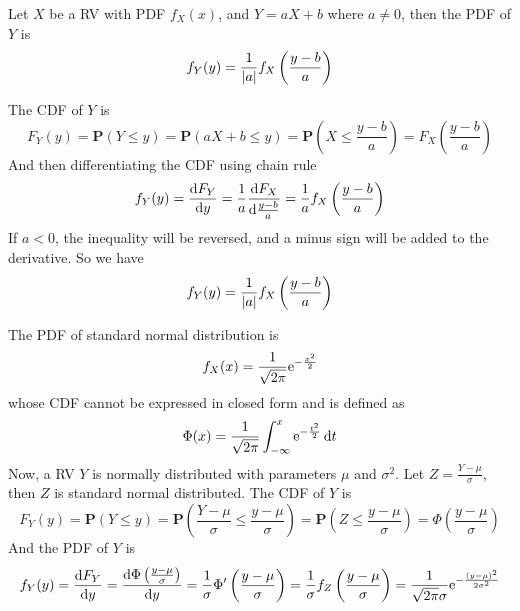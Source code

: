 \begin{example}[PDF of $Y = aX+b$]
    Let $X$ be a RV with PDF $f_{X}(x)$, and $Y = aX + b$ where $a \neq 0$, then the PDF of $Y$ is
    \begin{equation}
        f_{Y}(y) = \frac{1}{\abs{a}} f_{X}\left(\frac{y - b}{a}\right)
    \end{equation}
\end{example}
\begin{solution}
    The CDF of $Y$ is
    \begin{equation}
        F_{Y}(y) = \mathbf{P}(Y \leq y) = \mathbf{P}(aX + b \leq y) = \mathbf{P}\left(X \leq \frac{y - b}{a}\right) = F_{X}\left(\frac{y - b}{a}\right)
    \end{equation}
    And then differentiating the CDF using chain rule
    \begin{equation}
        f_{Y}(y) = \dv{F_{Y}}{y} = \frac{1}{a} \dv{F_{X}}{\frac{y - b}{a}} = \frac{1}{a} f_{X}\left(\frac{y - b}{a}\right)
    \end{equation}
    If $a < 0$, the inequality will be reversed, and a minus sign will be added to the derivative. So we have
    \begin{equation}
        f_{Y}(y) = \frac{1}{\abs{a}} f_{X}\left(\frac{y - b}{a}\right)
    \end{equation}
\end{solution}

\begin{example}
    The PDF of standard normal distribution is
    \begin{equation}
        f_{X}(x) = \frac{1}{\sqrt{2\pi}} \mathrm{e}^{-\frac{x^2}{2}}
    \end{equation}
    whose CDF cannot be expressed in closed form and is defined as
    \begin{equation}
        \Phi(x) = \frac{1}{\sqrt{2\pi}} \int_{-\infty}^{x} \mathrm{e}^{-\frac{t^2}{2}} \dd{t}
    \end{equation}
    Now, a RV $Y$ is normally distributed with parameters $\mu$ and $\sigma^2$. Let $Z = \frac{Y - \mu}{\sigma}$, then $Z$ is standard normal distributed. The CDF of $Y$ is
    \begin{equation}
        F_{Y}(y) = \mathbf{P}(Y \leq y) = \mathbf{P}\left(\frac{Y - \mu}{\sigma} \leq \frac{y - \mu}{\sigma}\right) = \mathbf{P}(Z \leq \frac{y - \mu}{\sigma}) = \Phi\left(\frac{y - \mu}{\sigma}\right)
    \end{equation}
    And the PDF of $Y$ is
    \begin{equation}
        f_{Y}(y) = \dv{F_{Y}}{y} = \dv{\Phi\left(\frac{y - \mu}{\sigma}\right)}{y} = \frac{1}{\sigma} \Phi'\left(\frac{y - \mu}{\sigma}\right) = \frac{1}{\sigma} f_{Z}\left(\frac{y - \mu}{\sigma}\right) = \frac{1}{\sqrt{2\pi}\sigma} \mathrm{e}^{-\frac{(y - \mu)^2}{2\sigma^2}}
    \end{equation}
\end{example}

